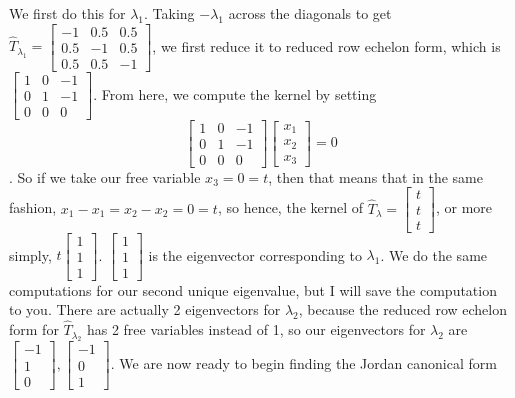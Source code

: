 \begin{enumerate}
 We first do this for $\lambda_1$. Taking $-\lambda_1$ across the diagonals to get $\hat{T}_{\lambda_1} = \begin{bmatrix} -1 & 0.5 & 0.5\\ 0.5 & -1 & 0.5\\ 0.5 & 0.5 & -1 \end{bmatrix}$, we first reduce it to reduced row echelon form, which is $\begin{bmatrix} 1 & 0 & -1\\ 0 & 1 & -1\\ 0 & 0 & 0 \end{bmatrix}$. From here, we compute the kernel by setting  
 \[\begin{bmatrix} 1 & 0 & -1\\ 0 & 1 & -1\\ 0 & 0 & 0 \end{bmatrix} \begin{bmatrix} x_1\\ x_2\\ x_3  \end{bmatrix} = 0\]. So if we take our free variable $x_3 = 0 = t$, then that means that in the same fashion, $x_1 - x_1 = x_2 - x_2 = 0 = t$, so hence, the kernel of $\hat{T}_{\lambda} = \begin{bmatrix} t\\ t\\ t \end{bmatrix}$, or more simply, $t\begin{bmatrix} 1\\ 1\\ 1 \end{bmatrix}$. $\begin{bmatrix} 1\\ 1\\ 1 \end{bmatrix}$ is the eigenvector corresponding to $\lambda_1$. We do the same computations for our second unique eigenvalue, but I will save the computation to you. There are actually 2 eigenvectors for $\lambda_2$, because the reduced row echelon form for $\hat{T}_{\lambda_2}$ has 2 free variables instead of 1, so our eigenvectors for $\lambda_2$ are $\begin{bmatrix} -1\\ 1\\ 0 \end{bmatrix}, \begin{bmatrix} -1\\ 0\\ 1 \end{bmatrix}$. We are now ready to begin finding the Jordan canonical form


\end{enumerate}
